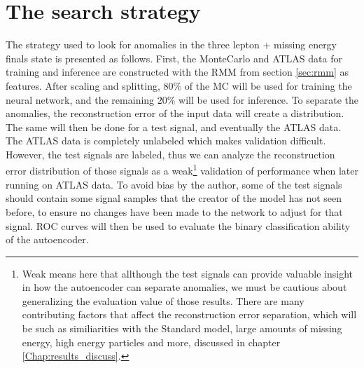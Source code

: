 \section{The search strategy}
The strategy used to look for anomalies in the three lepton + missing energy finals state is presented as follows. First, the MonteCarlo and ATLAS data 
for training and inference are constructed with the RMM from section \ref{sec:rmm} as features. After scaling and splitting, $80\%$ of the MC will be used for 
training the neural network, and the remaining $20\%$ will be used for inference. To separate the anomalies, the reconstruction error of the input data 
will create a distribution. The same will then be done for a test signal, and eventually the ATLAS data. The ATLAS data is completely unlabeled which 
makes validation difficult. However, the test signals are labeled, thus we can analyze the reconstruction error distribution of those signals as a 
weak\footnote{Weak means here that allthough the test signals can provide valuable insight in how the autoencoder can separate anomalies,
 we must be cautious about generalizing the evaluation value of those results. There are many contributing factors that affect the reconstruction error separation, 
 which will be such as similiarities with the Standard model, large amounts of missing energy, high energy particles and more,  discussed in chapter \ref{Chap:results_discuss}. } 
 validation of performance when later running on ATLAS data. To avoid bias by the author, 
some of the test signals should contain some signal samples that the creator of the model has not seen before, to ensure no changes have been made 
 to the network to adjust for that signal. ROC curves will then be used to evaluate the binary classification ability of the autoencoder. 